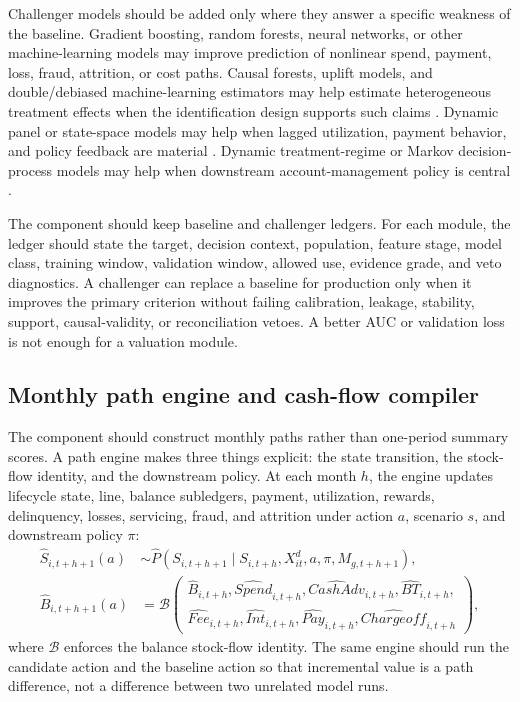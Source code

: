 \documentclass[11pt]{article}
\newcommand{\1}{\mathbf{1}}
\begin{document}
Challenger models should be added only where they answer a specific weakness
of the baseline. Gradient boosting, random forests, neural networks, or other
machine-learning models may improve prediction of nonlinear spend, payment,
loss, fraud, attrition, or cost paths. Causal forests, uplift models, and
double/debiased machine-learning estimators may help estimate heterogeneous
treatment effects when the identification design supports such claims
\citep{wager2018causalforests,chernozhukov2018dml}. Dynamic panel or
state-space models may help when lagged utilization, payment behavior, and
policy feedback are material \citep{arellano1991panel,blundell1998initial}.
Dynamic treatment-regime or Markov decision-process models may help when
downstream account-management policy is central
\citep{murphy2003dynamic,puterman1994mdp}.

The component should keep baseline and challenger ledgers. For each module,
the ledger should state the target, decision context, population, feature
stage, model class, training window, validation window, allowed use, evidence
grade, and veto diagnostics. A challenger can replace a baseline for
production only when it improves the primary criterion without failing
calibration, leakage, stability, support, causal-validity, or reconciliation
vetoes. A better AUC or validation loss is not enough for a valuation module.

\subsection{Monthly path engine and cash-flow compiler}
\label{subsec:path-engine}

The component should construct monthly paths rather than one-period summary
scores. A path engine makes three things explicit: the state transition, the
stock-flow identity, and the downstream policy. At each month $h$, the engine
updates lifecycle state, line, balance subledgers, payment, utilization,
rewards, delinquency, losses, servicing, fraud, and attrition under action
$a$, scenario $s$, and downstream policy $\pi$:
\begin{align}
  \widehat{S}_{i,t+h+1}(a)
  &\sim
  \widehat{P}(
    S_{i,t+h+1}\mid S_{i,t+h},X_{it}^{d},a,\pi,M_{g,t+h+1}), \\
  \widehat{B}_{i,t+h+1}(a)
  &=
  \mathcal{B}\!\left(
    \begin{array}{l}
    \widehat{B}_{i,t+h},\widehat{Spend}_{i,t+h},
    \widehat{CashAdv}_{i,t+h},\widehat{BT}_{i,t+h},\\
    \widehat{Fee}_{i,t+h},\widehat{Int}_{i,t+h},
    \widehat{Pay}_{i,t+h},\widehat{Chargeoff}_{i,t+h}
    \end{array}
  \right),
  \label{eq:path-engine-balance}
\end{align}
where $\mathcal{B}$ enforces the balance stock-flow identity. The same engine
should run the candidate action and the baseline action so that incremental
value is a path difference, not a difference between two unrelated model runs.
\end{document}
